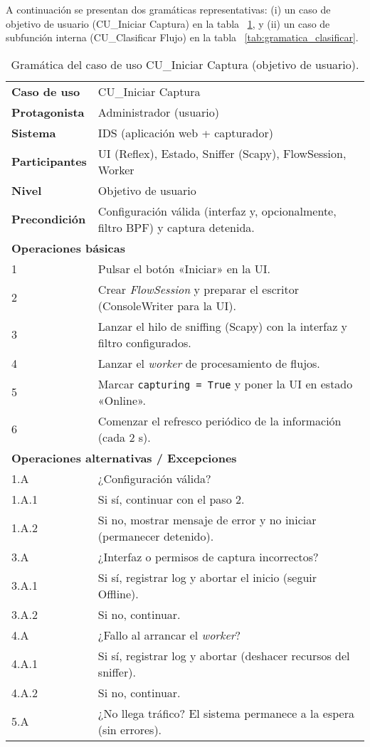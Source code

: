 A continuación se presentan dos gramáticas representativas: (i) un caso de objetivo de usuario (CU\_Iniciar Captura) en la tabla ~\ref{tab:gramatica_iniciar}, y (ii) un caso de subfunción interna (CU\_Clasificar Flujo) en la tabla ~\ref{tab:gramatica_clasificar}.

\begin{table}[H]
\centering
\small
\renewcommand{\arraystretch}{1.15}
\begin{tabular}{p{4.0cm} p{10.5cm}}
\hline
\textbf{Caso de uso} & CU\_Iniciar Captura \\
\textbf{Protagonista} & Administrador (usuario) \\
\textbf{Sistema} & IDS (aplicación web + capturador) \\
\textbf{Participantes} & UI (Reflex), Estado, Sniffer (Scapy), FlowSession, Worker \\
\textbf{Nivel} & Objetivo de usuario \\
\textbf{Precondición} & Configuración válida (interfaz y, opcionalmente, filtro BPF) y captura detenida. \\
\hline
\multicolumn{2}{l}{\textbf{Operaciones básicas}}\\
1 & Pulsar el botón «Iniciar» en la UI. \\
2 & Crear \textit{FlowSession} y preparar el escritor (ConsoleWriter para la UI). \\
3 & Lanzar el hilo de sniffing (Scapy) con la interfaz y filtro configurados. \\
4 & Lanzar el \textit{worker} de procesamiento de flujos. \\
5 & Marcar \texttt{capturing = True} y poner la UI en estado «Online». \\
6 & Comenzar el refresco periódico de la información (cada 2 s). \\
\hline
\multicolumn{2}{l}{\textbf{Operaciones alternativas / Excepciones}}\\
1.A & ¿Configuración válida? \\
1.A.1 & Si sí, continuar con el paso 2. \\
1.A.2 & Si no, mostrar mensaje de error y no iniciar (permanecer detenido). \\
3.A & ¿Interfaz o permisos de captura incorrectos? \\
3.A.1 & Si sí, registrar log y abortar el inicio (seguir Offline). \\
3.A.2 & Si no, continuar. \\
4.A & ¿Fallo al arrancar el \textit{worker}? \\
4.A.1 & Si sí, registrar log y abortar (deshacer recursos del sniffer). \\
4.A.2 & Si no, continuar. \\
5.A & ¿No llega tráfico? El sistema permanece a la espera (sin errores). \\
\hline
\end{tabular}
\caption{Gramática del caso de uso CU\_Iniciar Captura (objetivo de usuario).}
\label{tab:gramatica_iniciar}
\end{table}

